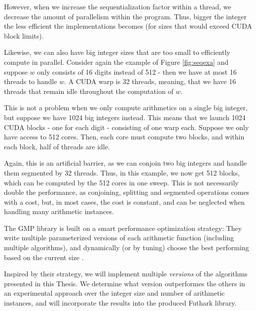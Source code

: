 However, when we increase the sequentialization factor within a thread, we
decrease the amount of parallelism within the program. Thus, bigger the integer the
less efficient the implementations becomes (for sizes that would exceed CUDA
block limits).

Likewise, we can also have big integer sizes that are too small to efficiently
compute in parallel. Consider again the example of Figure \ref{fig:seqexa} and
suppose $w$ only consists of 16 digits instead of 512 - then we have at most 16
threads to handle $w$. A CUDA warp is 32 threads, meaning, that we have 16
threads that remain idle throughout the computation of $w$.

This is not a problem when we only compute arithmetics on a single big integer,
but suppose we have 1024 big integers instead. This means that we launch 1024
CUDA blocks - one for each digit - consisting of one warp each. Suppose we only
have access to 512 cores. Then, each core must compute two blocks, and within
each block, half of threads are idle.

Again, this is an artificial barrier, as we can conjoin two big integers and
handle them segmented by 32 threads. Thus, in this example, we now get 512
blocks, which can be computed by the 512 cores in one sweep. This is not
necessarily double the performance, as conjoining, splitting and segmented
operations comes with a cost, but, in most cases, the cost is constant, and can
be neglected when handling many arithmetic instances.

The GMP library is built on a smart performance optimization strategy: They
write multiple parameterized versions of each arithmetic function (including
multiple algorithms), and dynamically (or by tuning) choose the best performing
based on the current size \cite{GMP}.

Inspired by their strategy, we will implement multiple \textit{versions} of the
algorithms presented in this Thesis. We determine what version outperformes the
others in an experimental approach over the integer size and number of
arithmetic instances, and will incorporate the results into the produced
Futhark library.

